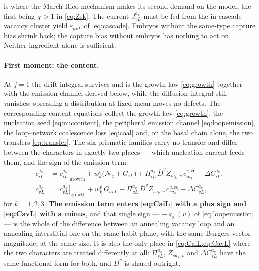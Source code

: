 \documentclass{article}
\begin{document}
 is where the March-Rico mechanism makes its second demand on
the model, the first being $\chi>1$ in \cref{eq:Zsk}. The current
$J^{a_k}_{vL}$ must be fed from the in-cascade vacancy cluster yield
$\varepsilon_{avL}$ of \cref{eq:cascade}. Embryos without the same-type capture
bias shrink back; the capture bias without embryos has nothing to act on.
Neither ingredient alone is sufficient.

\paragraph{First moment: the content.} At $j=1$ the drift integral survives and
is the growth law \cref{eq:growth} together with the emission channel derived
below, while the diffusion integral still vanishes: spreading a distribution at
fixed mean moves no defects. The corresponding content equations collect the growth law \cref{eq:growth}, the
nucleation seed \cref{eq:nuccontent}, the peripheral emission channel
\cref{eq:loopemission}, the loop--network coalescence loss \cref{eq:coal} and,
on the basal chain alone, the two transfers \cref{eq:transfer}. The six
prismatic families carry no transfer and differ between the characters in exactly
two places --- which nucleation current feeds them, and the sign of the emission
term:
\begin{align}
  \dot c^{a_k}_{iL} &=
      \left.\dot c^{a_k}_{iL}\right|_{\mathrm{growth}}
      +w^i_k\bigl(\mathcal N_c+G_{iL}\bigr)
      +\Pi^{a_k}_{iL}\,\overline D^{v}Z_{ia_k,v}\,c^{v,\mathrm{eq}}_{ia_k}
      -\Delta C^{a_k}_{iL},
  \label{eq:CaiL}\\
  \dot c^{a_k}_{vL} &=
      \left.\dot c^{a_k}_{vL}\right|_{\mathrm{growth}}
      +w^v_k\,G_{avL}
      -\Pi^{a_k}_{vL}\,\overline D^{v}Z_{va_k,v}\,c^{v,\mathrm{eq}}_{va_k}
      -\Delta C^{a_k}_{vL},
  \label{eq:CavL}
\end{align}
for $k=1,2,3$. \textbf{The emission term enters \cref{eq:CaiL} with a plus sign
and \cref{eq:CavL} with a minus}, and that single sign --- $-\varsigma_s(v)$ of
\cref{eq:loopemission} --- is the whole of the difference between an annealing
vacancy loop and an annealing interstitial one on the same habit plane, with the
same Burgers vector magnitude, at the same size. It is also the only place in
\cref{eq:CaiL,eq:CavL} where the two characters are treated differently at all:
$\Pi^{a_k}_{sL}$, $Z_{sa_k,v}$ and $\Delta C^{a_k}_{sL}$ have the same functional
form for both, and $\overline D^{v}$ is shared outright.
\end{document}
